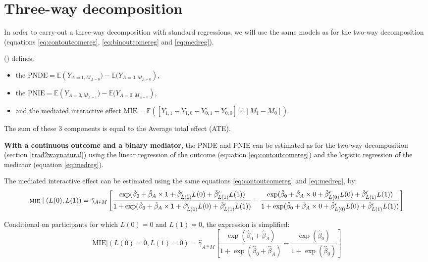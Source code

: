 \documentclass[
]{book}
\providecommand{\tightlist}{%
  \setlength{\itemsep}{0pt}\setlength{\parskip}{0pt}}
\begin{document}
\section{Three-way decomposition}\label{trad3way}

In order to carry-out a three-way decomposition with standard regressions, we will use the same models as for the two-way decomposition (equations \eqref{eq:contoutcomereg}, \eqref{eq:binoutcomereg} and \eqref{eq:medreg}).

() defines:

\begin{itemize}
\tightlist
\item
  the \(\text{PNDE} = \mathbb{E}\left(Y_{A=1,M_{A=0}}) - \mathbb{E}(Y_{A=0,M_{A=0}}\right)\),
\item
  the \(\text{PNIE} = \mathbb{E}\left(Y_{A=0,M_{A=1}}) - \mathbb{E}(Y_{A=0,M_{A=0}}\right)\),
\item
  and the mediated interactive effect \(\text{MIE} = \mathbb{E}\left( \left[ Y_{1,1} - Y_{1,0} - Y_{0,1} - Y_{0,0}\right] \times \left[M_1 - M_0 \right]\right)\).
\end{itemize}

The sum of these 3 components is equal to the Average total effect (ATE).

\textbf{With a continuous outcome and a binary mediator}, the PNDE and PNIE can be estimated as for the two-way decomposition (section \ref{trad2waynatural}) using the linear regression of the outcome (equation \eqref{eq:contoutcomereg}) and the logistic regression of the mediator (equation \eqref{eq:medreg}).

The mediated interactive effect can be estimated using the same equations \eqref{eq:contoutcomereg} and \eqref{eq:medreg}, by:
\[ \scriptsize \text{MIE} \mid (L(0), L(1)) = \hat{\gamma}_{A \ast M} \left[ \frac{\exp (\hat{\beta}_0 + \hat{\beta}_A \times 1 + \hat{\beta}_{L(0)}^\prime L(0) + \hat{\beta}_{L(1)}^\prime L(1))}{1 + \exp (\hat{\beta}_0 + \hat{\beta}_A \times 1 + \hat{\beta}_{L(0)}^\prime L(0) + \hat{\beta}_{L(1)}^\prime L(1))} - \frac{\exp (\hat{\beta}_0 + \hat{\beta}_A \times 0 + \hat{\beta}_{L(0)}^\prime L(0) + \hat{\beta}_{L(1)}^\prime L(1))}{1 + \exp (\hat{\beta}_0 + \hat{\beta}_A \times 0 + \hat{\beta}_{L(0)}^\prime L(0) + \hat{\beta}_{L(1)}^\prime L(1))}\right]\]

Conditional on participants for which \(L(0)=0\) and \(L(1)=0\), the expression is simplified:
\[\text{MIE} \Big| (L(0)=0, L(1)=0) = \hat{\gamma}_{A \ast M} \left[ \frac{\exp (\hat{\beta}_0 + \hat{\beta}_A )}{1 + \exp (\hat{\beta}_0 + \hat{\beta}_A )} - \frac{\exp (\hat{\beta}_0)}{1 + \exp (\hat{\beta}_0)}\right]\]
\end{document}
